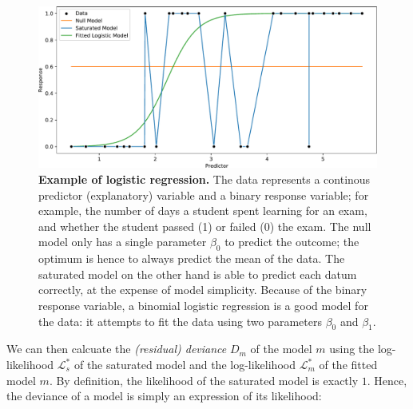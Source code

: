 \begin{figure}[!htb]
    \centering
    \includegraphics[width=\linewidth]{pdf/logistic_regression.pdf}
    \caption[Example of logistic regression]{
        \textbf{Example of logistic regression.}
        The data represents a continous predictor (explanatory) variable and a binary response variable;
        for example, the number of days a student spent learning for an exam,
        and whether the student passed (1) or failed (0) the exam.
        The null model only has a single parameter $\beta_0$ to predict the outcome;
        the optimum is hence to always predict the mean of the data.
        The saturated model on the other hand is able to predict each datum correctly,
        at the expense of model simplicity.
        Because of the binary response variable, a binomial logistic regression is a good model for the data:
        it attempts to fit the data using two parameters $\beta_0$ and $\beta_1$.
    }
    \label{fig:logistic_regression}
\end{figure}



We can then calcuate the \emph{(residual) deviance} $D_m$ of the model $m$ using
the log-likelihood $\mathcal{L}^*_s$ of the saturated model
and the log-likelihood $\mathcal{L}^*_m$ of the fitted model $m$.
By definition, the likelihood of the saturated model is exactly $1$.
Hence, the deviance of a model is simply an expression of its likelihood:

